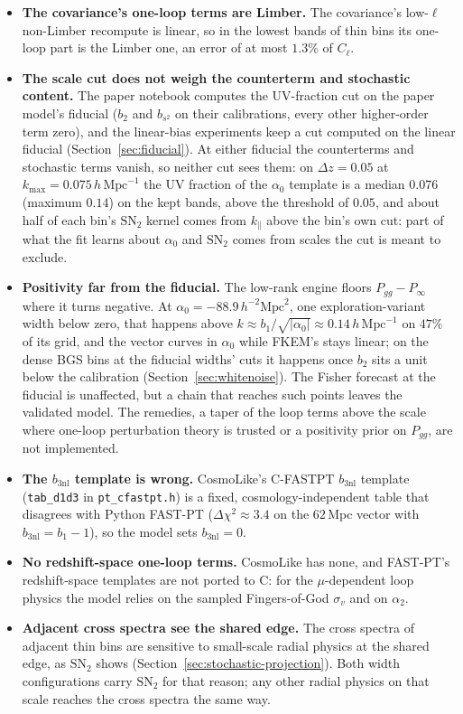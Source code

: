 \documentclass[11pt]{article}
\newcommand{\bone}{b_1}            %
\newcommand{\btwo}{b_2}            %
\newcommand{\bs}{b_{s^2}}          %
\newcommand{\bthree}{b_{3\mathrm{nl}}} %
\newcommand{\kmax}{k_{\mathrm{max}}}
\newcommand{\hMpc}{\,h\,\mathrm{Mpc}^{-1}}
\newcommand{\aunit}{\,h^{-2}\mathrm{Mpc}^2}
\newcommand{\SNt}{\mathrm{SN}_2}
\begin{document}
\begin{itemize}
\item \textbf{The covariance's one-loop terms are Limber.}  The
covariance's low-$\ell$ non-Limber recompute is linear, so in the
lowest bands of thin bins its one-loop part is the Limber one, an
error of at most $1.3\%$ of $C_\ell$.
\item \textbf{The scale cut does not weigh the counterterm and
stochastic content.}  The paper notebook computes the UV-fraction cut
on the paper model's fiducial ($\btwo$ and $\bs$ on their
calibrations, every other higher-order term zero), and the linear-bias
experiments keep a cut computed on the linear fiducial
(Section~\ref{sec:fiducial}).  At either fiducial the counterterms and
stochastic terms vanish, so neither cut sees them: on
$\Delta z = 0.05$ at $\kmax = 0.075\hMpc$ the UV fraction of the
$\alpha_0$ template is a median $0.076$ (maximum $0.14$) on the kept
bands, above the threshold of $0.05$, and about half of each bin's
$\SNt$ kernel comes from $k_\parallel$ above the bin's own cut: part of
what the fit learns about $\alpha_0$ and $\SNt$ comes from scales the
cut is meant to exclude.
\item \textbf{Positivity far from the fiducial.}  The low-rank engine
floors $P_{gg} - P_\infty$ where it turns negative.  At
$\alpha_0 = -88.9\aunit$, one exploration-variant width below zero,
that happens
above $k \approx \bone/\sqrt{|\alpha_0|} \approx 0.14\hMpc$ on $47\%$
of its grid, and the vector curves in $\alpha_0$ while FKEM's stays
linear; on the dense BGS bins at the fiducial widths' cuts it happens
once
$\btwo$ sits a unit below the calibration
(Section~\ref{sec:whitenoise}).  The Fisher forecast at the fiducial is
unaffected, but a chain that reaches such points leaves the validated
model.  The remedies, a taper of the loop terms above the scale where
one-loop perturbation theory is trusted or a positivity prior on
$P_{gg}$, are not implemented.
\item \textbf{The $\bthree$ template is wrong.}  CosmoLike's C-FASTPT
$\bthree$ template (\texttt{tab\_d1d3} in \texttt{pt\_cfastpt.h}) is a
fixed, cosmology-independent table that disagrees with Python FAST-PT
($\Delta\chi^2 \approx 3.4$ on the $62$\,Mpc vector with
$\bthree = \bone - 1$), so the model sets $\bthree = 0$.
\item \textbf{No redshift-space one-loop terms.}  CosmoLike has none,
and FAST-PT's redshift-space templates are not ported to C: for the
$\mu$-dependent loop physics the model relies on the sampled
Fingers-of-God $\sigma_v$ and on $\alpha_2$.
\item \textbf{Adjacent cross spectra see the shared edge.}  The cross
spectra of adjacent thin bins are sensitive to small-scale radial
physics at the shared edge, as $\SNt$ shows
(Section~\ref{sec:stochastic-projection}).  Both width configurations
carry $\SNt$
for that reason; any other radial physics on that scale reaches the
cross spectra the same way.
\end{itemize}
\end{document}
